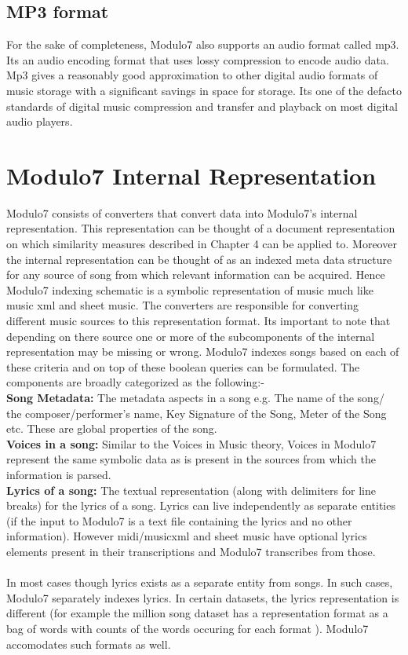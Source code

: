 \subsection{MP3 format}
\noindent For the sake of completeness, Modulo7 also supports an audio format called mp3. Its an audio encoding format that uses lossy compression to encode audio data. Mp3 gives a reasonably good approximation to other digital audio formats of music storage with a significant savings in space for storage. Its one of the defacto standards of digital music compression and transfer and playback on most digital audio players. 

\section{Modulo7 Internal Representation}

\noindent Modulo7 consists of converters that convert data into Modulo7's internal representation. This representation can be thought of a document representation on which similarity measures described in Chapter 4 can be applied to. Moreover the internal representation can be thought of as an indexed meta data structure for any source of song from which relevant information can be acquired. Hence Modulo7 indexing schematic is a symbolic representation of music much like music xml and sheet music. The converters are responsible for converting different music sources to this representation format. Its important to note that depending on there source one or more of the subcomponents of the internal representation may be missing or wrong. Modulo7 indexes songs based on each of these criteria and on top of these boolean queries can be formulated. The components are broadly categorized as the following:-\\

\noindent \textbf{Song Metadata:} The metadata aspects in a song e.g. The name of the song/ the composer/performer's name, Key Signature of the Song, Meter of the Song etc. These are global properties of the song. \\

\noindent \textbf{Voices in a song:} Similar to the Voices in Music theory, Voices in Modulo7 represent the same symbolic data as is present in the sources from which the information is parsed.\\

\noindent \textbf{Lyrics of a song:} The textual representation (along with delimiters for line breaks) for the lyrics of a song. Lyrics can live independently as separate entities (if the input to Modulo7 is a text file containing the lyrics and no other information). However midi/musicxml and sheet music have optional lyrics elements present in their transcriptions and Modulo7 transcribes from those. \\\\
In most cases though lyrics exists as a separate entity from songs. In such cases, Modulo7 separately indexes lyrics. In certain datasets, the lyrics representation is different (for example the million song dataset has a representation format as a bag of words with counts of the words occuring for each format \cite{msd}). Modulo7 accomodates such formats as well.

